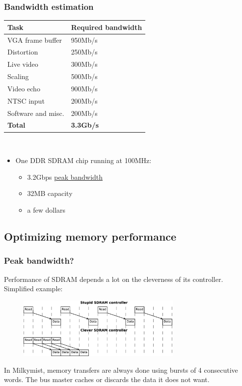 \documentclass{beamer}
\begin{document}
\frame
{
  \frametitle{Bandwidth estimation}

  \begin{tabular}{|l|l|}
  \hline
  \textbf{Task} & \textbf{Required bandwidth} \\
  \hline
  VGA frame buffer & 950Mb/s \\
  \hline
  Distortion & 250Mb/s \\
  \hline
  Live video & 300Mb/s \\
  \hline
  Scaling & 500Mb/s \\
  \hline
  Video echo & 900Mb/s \\
  \hline
  NTSC input & 200Mb/s \\
  \hline
  Software and misc. & 200Mb/s \\
  \hline
  \textbf{Total} & \textbf{3.3Gb/s} \\
  \hline
  \end{tabular}\\

  \begin{itemize}
  \item One DDR SDRAM chip running at 100MHz:
  \begin{itemize}
  \item 3.2Gbps \underline{peak bandwidth}
  \item 32MB capacity
  \item a few dollars
  \end{itemize}
  \end{itemize}
}

\subsection{Optimizing memory performance}
\frame
{
  \frametitle{Peak bandwidth?}

  Performance of SDRAM depends a lot on the cleverness of its controller. Simplified example:

  \begin{figure}[H]
  \includegraphics[height=30mm]{memlatency.eps}
  \end{figure}

  In Milkymist, memory transfers are always done using bursts of 4 consecutive words. The bus master caches or discards the data it does not want.
}
\end{document}
